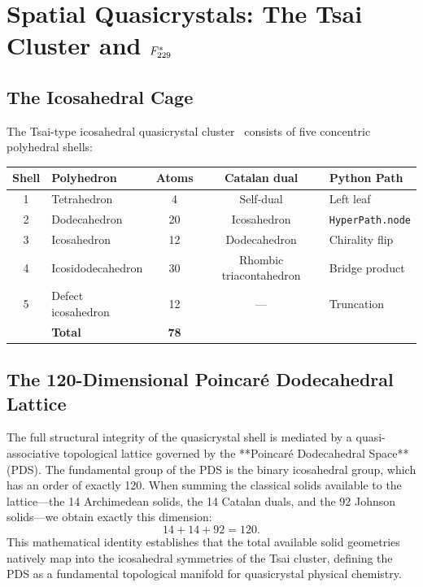 \section{Spatial Quasicrystals: The Tsai Cluster and $F_{229}^*$}
\label{sec:spatial-qc}

\subsection{The Icosahedral Cage}

The Tsai-type icosahedral quasicrystal cluster~\cite{Tsai04} consists of five concentric polyhedral shells:

\begin{center}
\begin{tabular}{clccl}
\toprule
Shell & Polyhedron & Atoms & Catalan dual & Python Path \\
\midrule
1 & Tetrahedron         & 4  & Self-dual       & Left leaf \\
2 & Dodecahedron        & 20 & Icosahedron     & \texttt{HyperPath.node} \\
3 & Icosahedron         & 12 & Dodecahedron    & Chirality flip \\
4 & Icosidodecahedron   & 30 & Rhombic triacontahedron & Bridge product \\
5 & Defect icosahedron  & 12 & ---             & Truncation \\
\midrule
  & \textbf{Total}      & \textbf{78} & & \\
\bottomrule
\end{tabular}
\end{center}

\subsection{The 120-Dimensional Poincaré Dodecahedral Lattice}

The full structural integrity of the quasicrystal shell is mediated by a quasi-associative topological lattice governed by the **Poincaré Dodecahedral Space** (PDS). The fundamental group of the PDS is the binary icosahedral group, which has an order of exactly 120. When summing the classical solids available to the lattice—the 14 Archimedean solids, the 14 Catalan duals, and the 92 Johnson solids—we obtain exactly this dimension:
\[
14 + 14 + 92 = 120.
\]
This mathematical identity establishes that the total available solid geometries natively map into the icosahedral symmetries of the Tsai cluster, defining the PDS as a fundamental topological manifold for quasicrystal physical chemistry.


